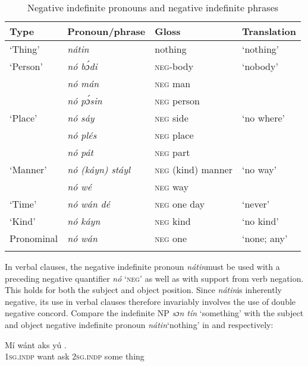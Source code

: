 \begin{table}
\caption{Negative indefinite pronouns and negative indefinite phrases}
\label{tab:key:7.2}

\begin{tabularx}{\textwidth}{Xlll}
\lsptoprule
Type & Pronoun/phrase & Gloss & Translation\\
\midrule
‘Thing’ & \itshape nátin & nothing & ‘nothing’\\
‘Person’ & \itshape nó bɔ́di & \textsc{neg}{}-body & ‘nobody’\\
& \itshape nó mán & \textsc{neg} man & \\
& \itshape nó pɔ́sin & \textsc{neg} person & \\
‘Place’ & \itshape nó sáy & \textsc{neg} side & ‘no where’\\
& \itshape nó plés & \textsc{neg} place & \\
& \itshape nó pát & \textsc{neg} part & \\
‘Manner’ & \itshape nó (káyn) stáyl & \textsc{neg} (kind) manner & ‘no way’\\
& \itshape nó wé & \textsc{neg} way & \\
‘Time’ & \itshape nó wán dé & \textsc{neg} one day & ‘never’\\
‘Kind’ & \itshape nó káyn & \textsc{neg} kind & ‘no kind’\\
Pronominal & \itshape nó wán & \textsc{neg} one & ‘none; any’\\
\lspbottomrule
\end{tabularx}
\end{table}
In verbal clauses, the negative indefinite pronoun \textit{nátin}must be used with a preceding negative quantifier \textit{nó} ‘\textsc{neg’} as well as with support from verb negation. This holds for both the subject and object position. Since \textit{nátin}is inherently negative, its use in verbal clauses therefore invariably involves the use of double negative concord. Compare the indefinite \textsc{NP} \textit{sɔn tín} ‘something’  with the subject and object negative indefinite pronoun \textit{nátin}‘nothing’ in  and  respectively:


\ea%
    \label{ex:key:557}
    \gll Mí    wánt  aks yú        .\\
\textsc{1sg.indp}  want  ask  \textsc{2sg.indp}  some  thing\\

